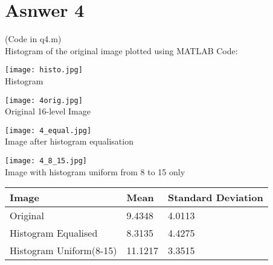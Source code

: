 \documentclass[10pt]{article}
\begin{document}
\section{Asnwer 4}
(Code in q4.m)\\
Histogram of the original image plotted using MATLAB Code:
\begin{center}
\texttt{[image: histo.jpg]}\\Histogram
\end{center}
\begin{center}
\texttt{[image: 4orig.jpg]}\\Original 16-level Image
\end{center}
\begin{center}
\texttt{[image: 4\_equal.jpg]}\\Image after histogram equalisation
\end{center}
\begin{center}
\texttt{[image: 4\_8\_15.jpg]}\\Image with histogram uniform from 8 to 15 only
\end{center}

\begin{table}[h!]
\centering
  
   \begin{tabular}{|p{4cm}|p{3cm}|p{3cm}|}
  \hline
  Image & Mean & Standard Deviation\\
  \hline
  Original & 9.4348 & 4.0113\\
  \hline
  Histogram Equalised & 8.3135 & 4.4275\\
  \hline
  Histogram Uniform(8-15) & 11.1217 & 3.3515\\
  \hline
  \end{tabular}
\end{table}
\end{document}
